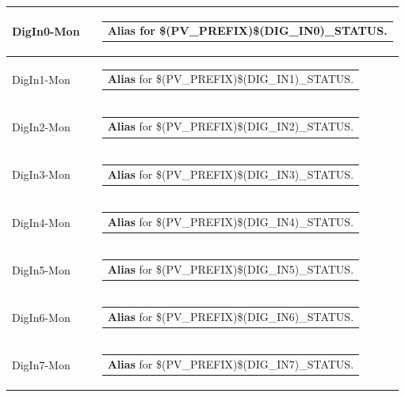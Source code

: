 \documentclass[openany]{article}
\begin{document}
\begin{longtable}{| m{4.5cm} m{2.5cm}  m{8.5cm} |}
        DigIn0-Mon &  & \begin{tabular}{@{}m{6cm}@{}}
                \textbf{\color{blue} Alias} for \$(PV\_PREFIX)\$(DIG\_IN0)\_STATUS.
            \end{tabular} \hypertarget{pv:dig-in-1}{}\\ \hline
        DigIn1-Mon &  & \begin{tabular}{@{}m{6cm}@{}}
                \textbf{\color{blue} Alias} for \$(PV\_PREFIX)\$(DIG\_IN1)\_STATUS.
            \end{tabular} \hypertarget{pv:dig-in-2}{}\\ \hline
        DigIn2-Mon &  & \begin{tabular}{@{}m{6cm}@{}}
                \textbf{\color{blue} Alias} for \$(PV\_PREFIX)\$(DIG\_IN2)\_STATUS.
            \end{tabular} \hypertarget{pv:dig-in-3}{}\\ \hline
        DigIn3-Mon &  & \begin{tabular}{@{}m{6cm}@{}}
                \textbf{\color{blue} Alias} for \$(PV\_PREFIX)\$(DIG\_IN3)\_STATUS.
            \end{tabular} \hypertarget{pv:dig-in-4}{}\\ \hline
        DigIn4-Mon &  & \begin{tabular}{@{}m{6cm}@{}}
                \textbf{\color{blue} Alias} for \$(PV\_PREFIX)\$(DIG\_IN4)\_STATUS.
            \end{tabular} \hypertarget{pv:dig-in-5}{}\\ \hline
        DigIn5-Mon &  & \begin{tabular}{@{}m{6cm}@{}}
                \textbf{\color{blue} Alias} for \$(PV\_PREFIX)\$(DIG\_IN5)\_STATUS.
            \end{tabular} \hypertarget{pv:dig-in-6}{}\\ \hline
        DigIn6-Mon &  & \begin{tabular}{@{}m{6cm}@{}}
                \textbf{\color{blue} Alias} for \$(PV\_PREFIX)\$(DIG\_IN6)\_STATUS.
            \end{tabular} \hypertarget{pv:dig-in-7}{}\\ \hline
        DigIn7-Mon &  & \begin{tabular}{@{}m{6cm}@{}}
                \textbf{\color{blue} Alias} for \$(PV\_PREFIX)\$(DIG\_IN7)\_STATUS.

\end{tabular}
\end{longtable}
\end{document}
